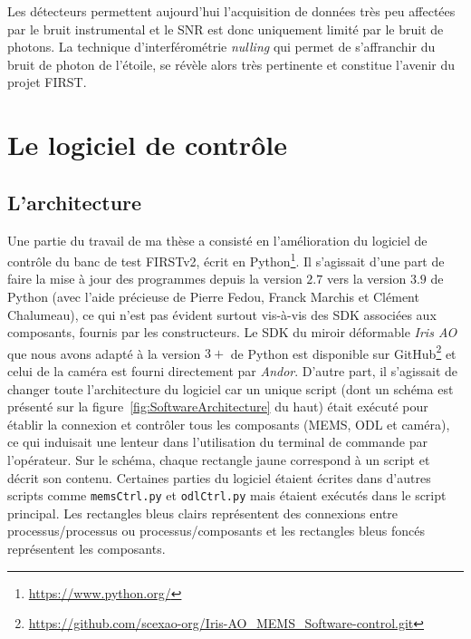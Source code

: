 Les détecteurs permettent aujourd'hui l'acquisition de données très peu affectées par le bruit instrumental et le \ac{SNR} est donc uniquement limité par le bruit de photons. La technique d'interférométrie \textit{nulling} qui permet de s'affranchir du bruit de photon de l'étoile, se révèle alors très pertinente et constitue l'avenir du projet \ac{FIRST}.


\section{Le logiciel de contrôle}
\label{sec:ControlSoftware}

\subsection{L'architecture}

Une partie du travail de ma thèse a consisté en l'amélioration du logiciel de contrôle du banc de test \ac{FIRSTv2}, écrit en Python\footnote{\url{https://www.python.org/}}. Il s'agissait d'une part de faire la mise à jour des programmes depuis la version $2.7$ vers la version $3.9$ de Python (avec l'aide précieuse de Pierre Fedou, Franck Marchis et Clément Chalumeau), ce qui n'est pas évident surtout vis-à-vis des \ac{SDK} associées aux composants, fournis par les constructeurs. Le \ac{SDK} du miroir déformable \textit{Iris AO} que nous avons adapté à la version $3+$ de Python est disponible sur GitHub\footnote{\url{https://github.com/scexao-org/Iris-AO_MEMS_Software-control.git}} et celui de la caméra est fourni directement par \textit{Andor}. D'autre part, il s'agissait de changer toute l'architecture du logiciel car un unique script (dont un schéma est présenté sur la figure~\ref{fig:SoftwareArchitecture} du haut) était exécuté pour établir la connexion et contrôler tous les composants (\ac{MEMS}, \ac{ODL} et caméra), ce qui induisait une lenteur dans l'utilisation du terminal de commande par l'opérateur. Sur le schéma, chaque rectangle jaune correspond à un script et décrit son contenu. Certaines parties du logiciel étaient écrites dans d'autres scripts comme \texttt{memsCtrl.py} et \texttt{odlCtrl.py} mais étaient exécutés dans le script principal. Les rectangles bleus clairs représentent des connexions entre processus/processus ou processus/composants et les rectangles bleus foncés représentent les composants.


